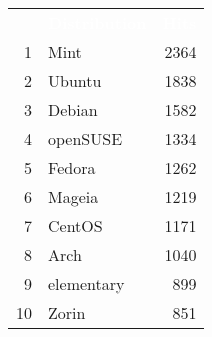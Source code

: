 \documentclass{article}
\newcommand{\head}[1]{%
  \textcolor{white}{\textbf{#1}}}
\begin{document}
\begin{table}[ht]
  \centering
  \sffamily
  \begin{tabular}{rlr}
    \rowcolor{black!75}
     & \head{Distribution} & \head{Hits} \\
    1 & Mint       & 2364 \\
    2 & Ubuntu     & 1838 \\
    3 & Debian     & 1582 \\
    4 & openSUSE   & 1334 \\
    5 & Fedora     & 1262 \\
    6 & Mageia     & 1219 \\
    7 & CentOS     & 1171 \\
    8 & Arch       & 1040 \\
    9 & elementary &  899 \\
   10 & Zorin      &  851 \\
 \end{tabular}
\end{table}
\end{document}
